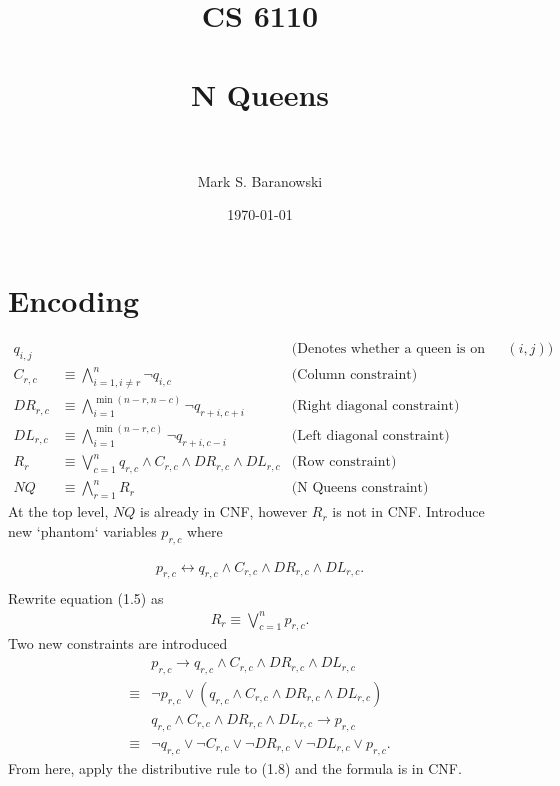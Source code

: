 \documentclass[paper=a4, fontsize=11pt]{scrartcl} %
\title{	
\normalfont \normalsize 
\textsc{CS 6110} \\ [25pt] %
\horrule{0.5pt} \\[0.4cm] %
\huge N Queens \\ %
\horrule{2pt} \\[0.5cm] %
}
\author{Mark S. Baranowski} %
\date{\normalsize\today} %
\numberwithin{equation}{section} %
\numberwithin{figure}{section} %
\numberwithin{table}{section} %
\begin{document}
\maketitle %


\section{Encoding}

\begin{align}
q_{i,j} & & \text{(Denotes whether a queen is on the square $(i,j)$)}\\
C_{r,c} & \equiv \bigwedge_{i=1, i \ne r}^n \neg q_{i,c} & \text{(Column constraint)}\\
DR_{r,c} & \equiv \bigwedge_{i=1}^{\min(n-r, n-c)}\neg q_{r+i, c+i} & \text{(Right diagonal constraint)}\\
DL_{r,c} & \equiv \bigwedge_{i=1}^{\min(n-r, c)}\neg q_{r+i, c-i} & \text{(Left diagonal constraint)}\\
R_{r} &\equiv \bigvee_{c=1}^n q_{r,c} \wedge C_{r,c}\wedge DR_{r,c} \wedge DL_{r,c} &\text{(Row constraint)}\\
NQ &\equiv \bigwedge_{r=1}^nR_r & \text{(N Queens constraint)}
\end{align}
At the top level, $NQ$ is already in CNF, however $R_r$ is not in CNF. Introduce new `phantom` variables $p_{r,c}$ where

\begin{align*}
p_{r,c}\leftrightarrow q_{r,c} \wedge C_{r,c}\wedge DR_{r,c} \wedge DL_{r,c}. \\
\end{align*} 
Rewrite equation (1.5) as
\begin{align*}
R_r \equiv \bigvee_{c=1}^n p_{r,c}.
\end{align*}
Two new constraints are introduced
\begin{align}
&p_{r,c} \rightarrow q_{r,c} \wedge C_{r,c} \wedge DR_{r,c} \wedge DL_{r,c}\\
\equiv&\neg p_{r,c} \vee (q_{r,c} \wedge C_{r,c} \wedge DR_{r,c} \wedge DL_{r,c})\\
&q_{r,c} \wedge C_{r,c} \wedge DR_{r,c} \wedge DL_{r,c}\rightarrow p_{r,c}\\
\equiv&\neg q_{r,c} \vee \neg C_{r,c} \vee \neg DR_{r,c} \vee \neg DL_{r,c} \vee p_{r,c}.
\end{align}
From here, apply the distributive rule to (1.8) and the formula is in CNF.
\end{document}
